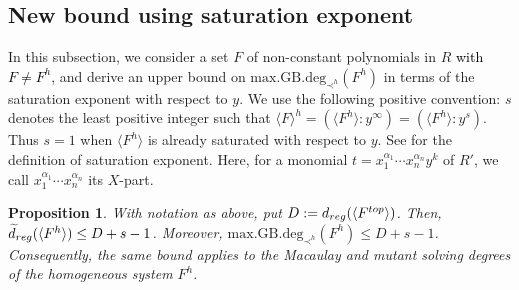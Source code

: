 \documentclass{article}
\newtheorem{proposition}[theorem]{Proposition}
\theoremstyle{definition}
\theoremstyle{plain}
\theoremstyle{plain}
\theoremstyle{plain}
\theoremstyle{plain}
\numberwithin{equation}{subsection}
\begin{document}
\subsection{New bound using saturation exponent}\label{subsec:satexp}

In this subsection, we consider a set $F$ of non-constant polynomials in $R$ \textcolor{black}{with $F \neq F^h$}, and derive an upper bound on $\mathrm{max.GB.deg}_{\prec^h}(F^h)$ in terms of the saturation exponent with respect to $y$.
We use the following positive convention:
$s$ denotes the least positive integer such that $\langle F\rangle^h=(\langle F^h\rangle : y^\infty)=(\langle F^h\rangle:y^s)$.
Thus $s=1$ when $\langle F^h\rangle$ is already saturated with respect to $y$.
See \cite[p.\ 81]{Singular} for the definition of saturation exponent. 
Here, for a monomial $t= x_1^{\alpha_1}\cdots x_n^{\alpha_n} y^{k}$ of $R'$, we call $x_1^{\alpha_1} \cdots x_n^{\alpha_n}$ its $X$-part.

\begin{proposition}\label{pro:dsat}
With notation as above, put $D:=d_{\rm reg}(\langle F^{\rm top}\rangle)$.
Then, $\widetilde{d}_{\rm reg}(\langle {F}^h\rangle)
\leq D+s-1$.
Moreover, $\mathrm{max.GB.deg}_{\prec^h}(F^h) \le D+s-1$.
Consequently, the same bound applies to the Macaulay and mutant solving degrees of the homogeneous system $F^h$.
\end{proposition}
\end{document}
